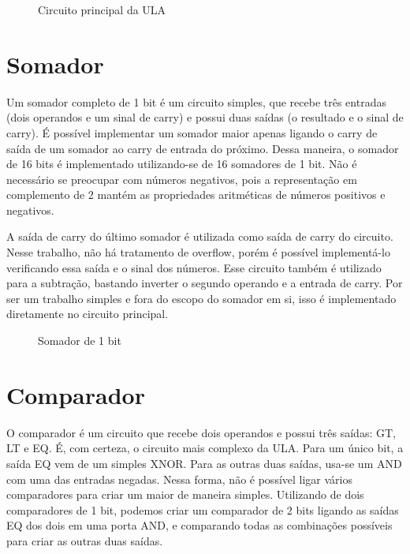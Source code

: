 \documentclass[twocolumn]{article}
\begin{document}
\begin{figure}[h]
    \centering
    
    \caption{Circuito principal da ULA}
\end{figure}

\section{Somador}

Um somador completo de 1 bit é um circuito simples, que recebe três entradas
(dois operandos e um sinal de carry) e possui duas saídas (o resultado e o sinal
de carry). É possível implementar um somador maior apenas ligando o carry de
saída de um somador ao carry de entrada do próximo. Dessa maneira, o somador de
16 bits é implementado utilizando-se de 16 somadores de 1 bit. Não é necessário
se preocupar com números negativos, pois a representação em complemento de 2
mantém as propriedades aritméticas de números positivos e negativos.

A saída de carry do último somador é utilizada como saída de carry do circuito.
Nesse trabalho, não há tratamento de overflow, porém é possível implementá-lo
verificando essa saída e o sinal dos números. Esse circuito também é utilizado
para a subtração, bastando inverter o segundo operando e a entrada de carry. Por
ser um trabalho simples e fora do escopo do somador em si, isso é implementado
diretamente no circuito principal.

\begin{figure}[h]
    
    \caption{Somador de 1 bit}
\end{figure}

\begin{strip}
    \centering 
\end{strip}

\section{Comparador}

O comparador é um circuito que recebe dois operandos e possui três saídas: GT,
LT e EQ. É, com certeza, o circuito mais complexo da ULA. Para um único bit, a
saída EQ vem de um simples XNOR. Para as outras duas saídas, usa-se um AND com
uma das entradas negadas. Nessa forma, não é possível ligar vários comparadores
para criar um maior de maneira simples. Utilizando de dois comparadores de 1
bit, podemos criar um comparador de 2 bits ligando as saídas EQ dos dois em uma
porta AND, e comparando todas as combinações possíveis para criar as outras duas
saídas.
\end{document}
